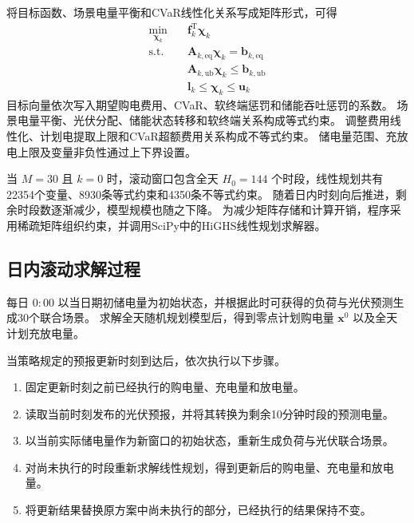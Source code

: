 将目标函数、场景电量平衡和CVaR线性化关系写成矩阵形式，可得
\begin{equation}
\begin{aligned}
\min_{\boldsymbol{\chi}_k}\quad
&\boldsymbol{f}_k^{\mathrm T}\boldsymbol{\chi}_k \\
\mathrm{s.t.}\quad
&\boldsymbol{A}_{k,\mathrm{eq}}\boldsymbol{\chi}_k
=\boldsymbol{b}_{k,\mathrm{eq}} \\
&\boldsymbol{A}_{k,\mathrm{ub}}\boldsymbol{\chi}_k
\leq\boldsymbol{b}_{k,\mathrm{ub}} \\
&\boldsymbol{l}_k
\leq\boldsymbol{\chi}_k
\leq\boldsymbol{u}_k
\end{aligned}
\label{eq:app_q3_standard_lp}
\end{equation}
目标向量依次写入期望购电费用、CVaR、软终端惩罚和储能吞吐惩罚的系数。
场景电量平衡、光伏分配、储能状态转移和软终端关系构成等式约束。
调整费用线性化、计划电提取上限和CVaR超额费用关系构成不等式约束。
储电量范围、充放电上限及变量非负性通过上下界设置。

当 \(M=30\) 且 \(k=0\) 时，滚动窗口包含全天
\(H_0=144\) 个时段，线性规划共有22354个变量、8930条等式约束和4350条不等式约束。
随着日内时刻向后推进，剩余时段数逐渐减少，模型规模也随之下降。
为减少矩阵存储和计算开销，程序采用稀疏矩阵组织约束，并调用SciPy中的HiGHS线性规划求解器。

\subsection{日内滚动求解过程}

每日 \(0{:}00\) 以当日期初储电量为初始状态，并根据此时可获得的负荷与光伏预测生成30个联合场景。
求解全天随机规划模型后，得到零点计划购电量
\(\boldsymbol{x}^{0}\) 以及全天计划充放电量。

当策略规定的预报更新时刻到达后，依次执行以下步骤。

\begin{enumerate}[label=\arabic*.]
    \item 固定更新时刻之前已经执行的购电量、充电量和放电量。
    \item 读取当前时刻发布的光伏预报，并将其转换为剩余10分钟时段的预测电量。
    \item 以当前实际储电量作为新窗口的初始状态，重新生成负荷与光伏联合场景。
    \item 对尚未执行的时段重新求解线性规划，得到更新后的购电量、充电量和放电量。
    \item 将更新结果替换原方案中尚未执行的部分，已经执行的结果保持不变。
\end{enumerate}

